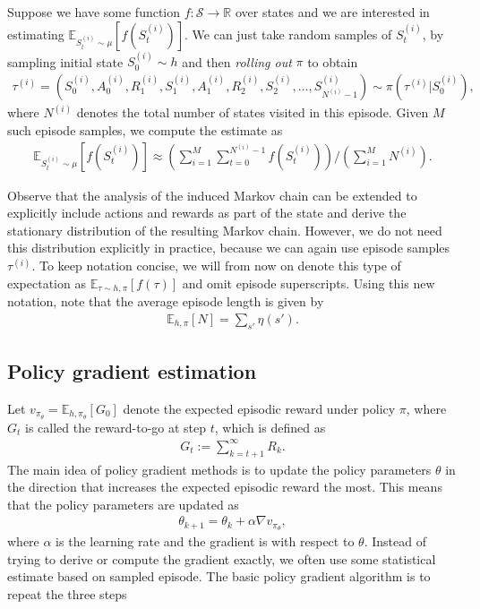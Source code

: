 \documentclass[a4paper]{report}
\theoremstyle{definition}
\theoremstyle{plain}
\begin{document}
Suppose we have some function $f : \mathcal{S} \rightarrow \mathbb{R}$ over
states and we are interested in estimating $\mathbb{E}_{S_{t}^{(i)} \sim \mu}[f(S_{t}^{(i)})]$.
%
We can just take random samples of $S_{t}^{(i)}$, by sampling initial state
$S_{0}^{(i)} \sim h$ and then \textit{rolling out} $\pi$ to obtain
\begin{align*}
\tau^{(i)} = (S_{0}^{(i)},A_{0}^{(i)},R_{1}^{(i)},S_{1}^{(i)},A_{1}^{(i)},R_{2}^{(i)},S_{2}^{(i)}, \dots, S_{N^{(i)}-1}^{(i)}) \sim \pi(\tau^{(i)} | S_{0}^{(i)}),
\end{align*}
where $N^{(i)}$ denotes the total number of states visited in this episode.
%
Given $M$ such episode samples, we compute the estimate as
\begin{align*}
  \mathbb{E}_{S_{t}^{(i)} \sim \mu} [ f(S_{t}^{(i)}) ] \approx \left( \sum_{i=1}^{M} \sum_{t=0}^{N^{(i)} - 1} f(S_{t}^{(i)}) \right) / \left( \sum_{i=1}^{M} N^{(i)} \right) .
\end{align*}

Observe that the analysis of the induced Markov chain can be extended to
explicitly include actions and rewards as part of the state and derive the
stationary distribution of the resulting Markov chain. However, we do not need
this distribution explicitly in practice, because we can again use episode
samples $\tau^{(i)}$. To keep notation concise, we will from now on denote this
type of expectation as $\mathbb{E}_{\tau \sim h,\pi}[f(\tau)]$ and omit episode
superscripts.
%
Using this new notation, note that the average episode length is given by
\begin{align*}
  \mathbb{E}_{h, \pi} [ N ]= \sum_{s'} \eta(s') .
\end{align*}

\subsection{Policy gradient estimation}

Let $v_{\pi_{\theta}} = \mathbb{E}_{h,\pi_{\theta}}[G_{0}]$ denote the expected
episodic reward under policy $\pi$, where $G_{t}$ is called the reward-to-go at
step $t$, which is defined as
\begin{align*}
  G_{t} := \sum_{k=t+1}^{\infty} R_{k} .
\end{align*}
The main idea of policy gradient methods is to update the policy parameters
$\theta$ in the direction that increases the expected episodic reward the most. This
means that the policy parameters are updated as
\begin{align*}
  \theta_{k+1} = \theta_{k} + \alpha \nabla v_{\pi_{\theta}} ,
\end{align*}
where $\alpha$ is the learning rate and the gradient is with respect to
$\theta$. Instead of trying to derive or compute the gradient exactly, we often
use some statistical estimate based on sampled episode. The basic policy
gradient algorithm is to repeat the three steps
\end{document}
